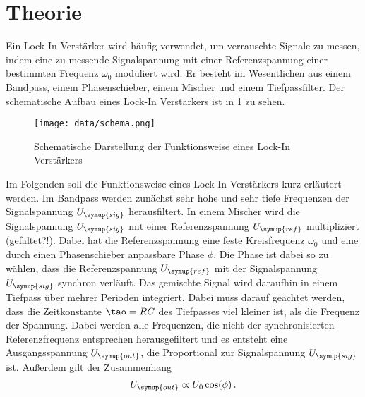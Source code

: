 \section{Theorie}
\label{sec:Theorie}

Ein Lock-In Verstärker wird häufig verwendet, um verrauschte Signale zu messen,
indem eine zu messende Signalspannung mit einer Referenzspannung einer bestimmten
Frequenz $\omega_0$ moduliert wird.
Er besteht im Wesentlichen aus einem Bandpass, einem Phasenschieber, einem Mischer
und einem Tiefpassfilter. Der schematische Aufbau eines Lock-In Verstärkers ist
in \ref{fig:schema} zu sehen.

\begin{figure}
  \centering
  \texttt{[image: data/schema.png]}
  \caption{Schematische Darstellung der Funktionsweise eines Lock-In Verstärkers}
  \label{fig:schema}
\end{figure}


Im Folgenden soll die Funktionsweise eines Lock-In Verstärkers kurz erläutert
werden. Im Bandpass werden zunächst sehr hohe und sehr tiefe Frequenzen der
Signalspannung $U_{\symup{sig}}$ herausfiltert. In einem Mischer wird die
Signalspannung $U_{\symup{sig}}$ mit einer Referenzspannung $U_{\symup{ref}}$
multipliziert (gefaltet?!). Dabei hat die Referenzspannung eine feste Kreisfrequenz
$\omega_0$ und eine durch einen Phasenschieber anpassbare Phase $\phi$. Die Phase
ist dabei so zu wählen, dass die Referenzspannung $U_{\symup{ref}}$ mit der
Signalspannung $U_{\symup{sig}}$ synchron verläuft. Das gemischte Signal wird
daraufhin in einem Tiefpass über mehrer Perioden integriert. Dabei muss darauf
geachtet werden, dass  die Zeitkonstante $\tao=RC$ des Tiefpasses viel kleiner
ist, als die Frequenz der Spannung. Dabei werden alle Frequenzen, die nicht
der synchronisierten Referenzfrequenz entsprechen herausgefiltert und es entsteht
eine Ausgangsspannung $U_{\symup{out}}$, die Proportional zur Signalspannung
$U_{\symup{sig}}$ ist. Außerdem gilt der Zusammenhang
\begin{equation}
  U_{\symup{out}}\propto U_0 \cos(\phi) \,.
\end{equation}
